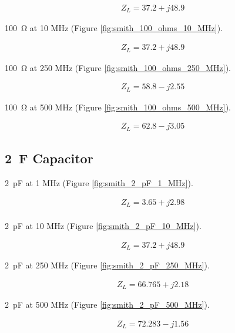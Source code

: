\documentclass[conference]{IEEEtran}
\begin{document}
\[
  \begin{array}{ll}
    Z_L = 37.2 + j 48.9
  \end{array}
  \]

  \SI{100}{\ohm} at 10 MHz (Figure \ref{fig:smith_100_ohms_10_MHz}).

  \[
    \begin{array}{ll}
      Z_L = 37.2 + j48.9
    \end{array}
  \]

  \SI{100}{\ohm} at 250 MHz (Figure \ref{fig:smith_100_ohms_250_MHz}).

  \[
    \begin{array}{ll}
      Z_L = 58.8 - j2.55
    \end{array}
  \]

  \SI{100}{\ohm} at 500 MHz (Figure \ref{fig:smith_100_ohms_500_MHz}).

  \[
    \begin{array}{ll}
      Z_L = 62.8 - j3.05
    \end{array}
  \]


\subsection{\SI{2}{\farad} Capacitor}
\SI{2}{\pico\farad} at 1 MHz (Figure
\ref{fig:smith_2_pF_1_MHz}).

\[
  \begin{array}{ll}
    Z_L = 3.65 + j2.98\\
  \end{array}
  \]

  \SI{2}{\pico\farad} at 10 MHz (Figure \ref{fig:smith_2_pF_10_MHz}).

  \[
    \begin{array}{ll}
      Z_L = 37.2 + j48.9
    \end{array}
  \]

  \SI{2}{\pico\farad} at 250 MHz (Figure \ref{fig:smith_2_pF_250_MHz}).

  \[
    \begin{array}{ll}
      Z_L = 66.765 + j2.18
    \end{array}
  \]

  \SI{2}{\pico\farad} at 500 MHz (Figure \ref{fig:smith_2_pF_500_MHz}).

  \[
    \begin{array}{ll}
      Z_L = 72.283 -j1.56
    \end{array}
  \]
\end{document}
